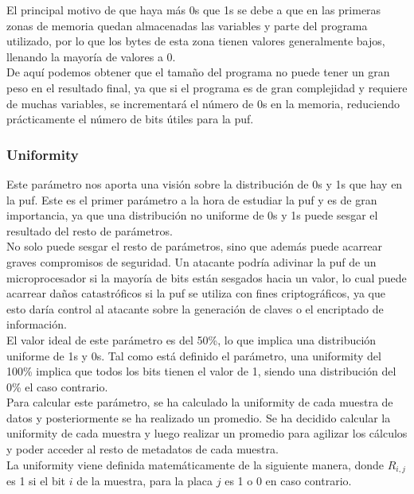 \documentclass[spanish]{template/minim}
\begin{document}
El principal motivo de que haya más 0s que 1s se debe a que en las primeras zonas de memoria quedan almacenadas las variables y parte del programa utilizado, por lo que los bytes de esta zona tienen valores generalmente bajos, llenando la mayoría de valores a 0.\\

De aquí podemos obtener que el tamaño del programa no puede tener un gran peso en el resultado final, ya que si el programa es de gran complejidad y requiere de muchas variables, se incrementará el número de 0s en la memoria, reduciendo prácticamente el número de bits útiles para la \gls{puf}.\\


\subsubsection{Uniformity}\label{sec:uniformity}


Este parámetro nos aporta una visión sobre la distribución de 0s y 1s que hay en la \gls{puf}. Este es el primer parámetro a la hora de estudiar la \gls{puf} y es de gran importancia, ya que una distribución no uniforme de 0s y 1s puede sesgar el resultado del resto de parámetros.\\

No solo puede sesgar el resto de parámetros, sino que además puede acarrear graves compromisos de seguridad. Un atacante podría adivinar la \gls{puf} de un microprocesador si la mayoría de bits están sesgados hacia un valor, lo cual puede acarrear daños catastróficos si la \gls{puf} se utiliza con fines criptográficos, ya que esto daría control al atacante sobre la generación de claves o el encriptado de información.\\

El valor ideal de este parámetro es del 50\%, lo que implica una distribución uniforme de 1s y 0s. Tal como está definido el parámetro, una uniformity del 100\% implica que todos los bits tienen el valor de 1, siendo una distribución del 0\% el caso contrario.\\

Para calcular este parámetro, se ha calculado la uniformity de cada muestra de datos y posteriormente se ha realizado un promedio. Se ha decidido calcular la uniformity de cada muestra y luego realizar un promedio para agilizar los cálculos y poder acceder al resto de metadatos de cada muestra.\\

La uniformity viene definida matemáticamente de la siguiente manera, donde $R_{i,j}$ es 1 si el bit $i$ de la muestra, para la placa $j$ es 1 o 0 en caso contrario.
\end{document}
